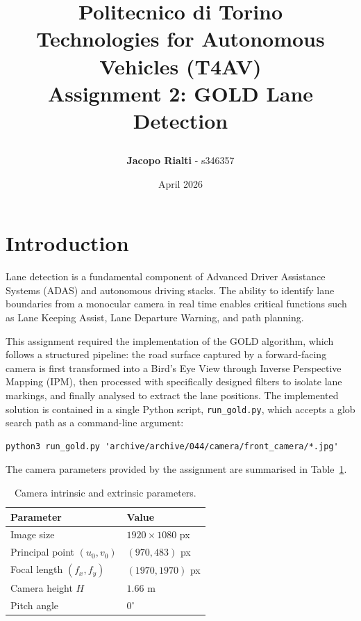 \documentclass[11pt,a4paper]{article}
\title{
    \vspace{-2cm}
    \begin{center}
        \Large Politecnico di Torino \\
        \vspace{0.5cm}
        \Large \textbf{Technologies for Autonomous Vehicles (T4AV)} \\
        \vspace{1cm}
        \Huge \textbf{Assignment 2: GOLD Lane Detection}
        \vspace{1cm}
    \end{center}
}
\author{\textbf{Jacopo Rialti} - s346357}
\date{April 2026}
\begin{document}
\maketitle

\tableofcontents
\newpage

\section{Introduction}

Lane detection is a fundamental component of Advanced Driver Assistance Systems (ADAS) and autonomous driving stacks. The ability to identify lane boundaries from a monocular camera in real time enables critical functions such as Lane Keeping Assist, Lane Departure Warning, and path planning.

This assignment required the implementation of the GOLD algorithm, which follows a structured pipeline: the road surface captured by a forward-facing camera is first transformed into a Bird's Eye View through Inverse Perspective Mapping (IPM), then processed with specifically designed filters to isolate lane markings, and finally analysed to extract the lane positions. The implemented solution is contained in a single Python script, \texttt{run\_gold.py}, which accepts a glob search path as a command-line argument:

\begin{verbatim}
python3 run_gold.py 'archive/archive/044/camera/front_camera/*.jpg'
\end{verbatim}

The camera parameters provided by the assignment are summarised in Table~\ref{tab:camera}.

\begin{table}[H]
\centering
\caption{Camera intrinsic and extrinsic parameters.}
\label{tab:camera}
\begin{tabular}{@{}ll@{}}
\toprule
\textbf{Parameter} & \textbf{Value} \\
\midrule
Image size & $1920 \times 1080$ px \\
Principal point $(u_0, v_0)$ & $(970, 483)$ px \\
Focal length $(f_x, f_y)$ & $(1970, 1970)$ px \\
Camera height $H$ & $1.66$ m \\
Pitch angle & $0^\circ$ \\
\bottomrule
\end{tabular}
\end{table}
\end{document}

